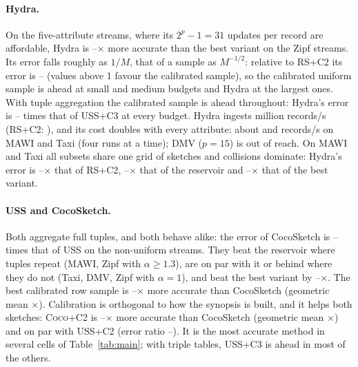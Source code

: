 \paragraph{Hydra.} On the five-attribute streams, where its $2^p-1=31$ updates per record are affordable,
Hydra is \NumOmniAnyVsHydraLo--\NumOmniAnyVsHydraHi$\times$ more accurate than the best \omni variant on
the Zipf streams. Its error falls roughly as $1/M$, that of a sample as $M^{-1/2}$: relative to
\textsc{RS+C2} its error is \NumHydraVsCalTwoLo--\NumHydraVsCalTwoHi{} (values above 1 favour the
calibrated sample), so the calibrated uniform sample is ahead at small and medium budgets and Hydra at the
largest ones. With tuple aggregation the calibrated sample is ahead throughout: Hydra's error is
\NumHydraVsUssCalThreeLo--\NumHydraVsUssCalThreeHi{} times that of \textsc{USS+C3} at every budget.
Hydra ingests \NumTpHydraIdle{} million records/s (\textsc{RS+C2}: \NumTpZipfCalTwo), and its cost
doubles with every attribute: about \NumTpHydraMawi{} and \NumTpHydraTaxi{} records/s on MAWI and Taxi
(four runs at a time); DMV ($p=15$) is out of reach. On MAWI and Taxi all subsets share one grid of
sketches and collisions dominate: Hydra's error is \NumHydraVsCalTwoRealLo--\NumHydraVsCalTwoRealHi$\times$
that of \textsc{RS+C2}, \NumHydraVsResRealLo--\NumHydraVsResRealHi$\times$ that of the reservoir and
\NumHydraVsOmniAnyRealLo--\NumHydraVsOmniAnyRealHi$\times$ that of the best \omni variant.

\paragraph{USS and CocoSketch.} Both aggregate full tuples, and both behave alike: the error of CocoSketch
is \NumCocoVsUssLo--\NumCocoVsUssHi{} times that of USS on the non-uniform streams. They beat the
reservoir where tuples repeat (MAWI, Zipf with $\alpha\ge1.3$), are on par with it or behind where they do
not (Taxi, DMV, Zipf with $\alpha=1$), and beat the best \omni variant by
\NumOmniAnyVsCocoLo--\NumOmniAnyVsCocoHi$\times$. The best calibrated row
sample is \NumCocoVsBestRowLo--\NumCocoVsBestRowHi$\times$ more accurate than CocoSketch (geometric mean
\NumCocoVsBestRowGm$\times$). Calibration is orthogonal to how the synopsis is built, and it helps both
sketches: \textsc{Coco+C2} is \NumCocoCalTwoVsCocoLo--\NumCocoCalTwoVsCocoHi$\times$ more accurate than
CocoSketch (geometric mean \NumCocoCalTwoVsCocoGm$\times$) and on par with \textsc{USS+C2} (error ratio
\NumCocoCalTwoVsUssCalTwoLo--\NumCocoCalTwoVsUssCalTwoHi). It is the most accurate method in several cells
of Table~\ref{tab:main}; with triple tables, \textsc{USS+C3} is ahead in most of the others.

